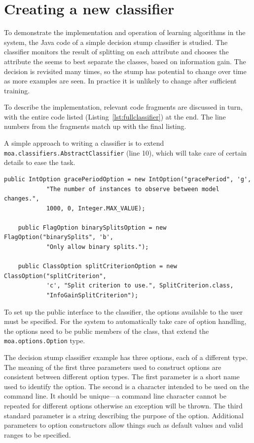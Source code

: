 \documentclass[a4paper,12pt,twoside]{book}
\begin{document}
\section{Creating a new classifier}

To demonstrate the implementation and operation of learning algorithms in the system, the Java code of a simple decision stump classifier is studied. The classifier monitors the result of splitting on each attribute and chooses the attribute the seems to best separate the classes, based on information gain. The decision is revisited many times, so the stump has potential to change over time as more examples are seen. In practice it is unlikely to change after sufficient training.

To describe the implementation, relevant code fragments are discussed in turn, with the entire code listed (Listing~\ref{lst:fullclassifier}) at the end. The line numbers from the fragments match up with the final listing.

A simple approach to writing a classifier is to extend  \\ \verb+moa.classifiers.AbstractClassifier+ (line 10), which will take care of certain details to ease the task.

\begin{lstlisting}[caption={Option handling},label=lst:opthandle,firstnumber=14]
	public IntOption gracePeriodOption = new IntOption("gracePeriod", 'g',
			"The number of instances to observe between model changes.",
			1000, 0, Integer.MAX_VALUE);

	public FlagOption binarySplitsOption = new FlagOption("binarySplits", 'b',
			"Only allow binary splits.");

	public ClassOption splitCriterionOption = new ClassOption("splitCriterion",
			'c', "Split criterion to use.", SplitCriterion.class,
			"InfoGainSplitCriterion");
\end{lstlisting}

To set up the public interface to the classifier, the options available to the user must be specified. For the system to automatically take care of option handling, the options need to be public members of the class, that extend the \verb+moa.options.Option+ type.

The decision stump classifier example has three options, each of a different type.
The meaning of the first three parameters used to construct options are consistent between different option types. The first parameter is a short name used to identify the option. The second is a character intended to be used on the command line. It should be unique---a command line character cannot be repeated for different options otherwise an exception will be thrown. The third standard parameter is a string describing the purpose of the option. Additional parameters to option constructors allow things such as default values and valid ranges to be specified.
\end{document}
